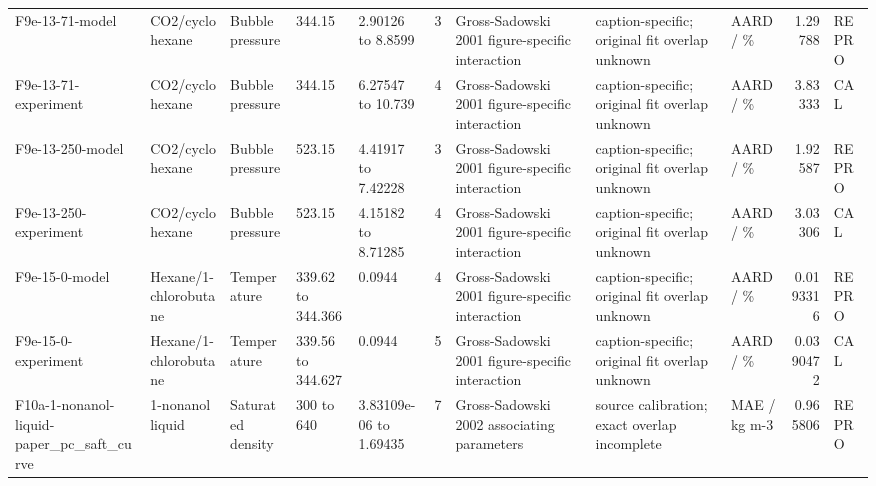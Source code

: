 \begin{landscape}
\begin{longtable}{L{1.9cm}L{2.5cm}L{2.1cm}L{1.6cm}L{1.6cm}rL{2.4cm}L{1.9cm}L{2.2cm}rL{1cm}}
F9e-\allowbreak{}13-\allowbreak{}71-\allowbreak{}model & CO2/\allowbreak{}cyclohexane & Bubble pressure & 344.15 & 2.90126 to 8.8599 & 3 & Gross-\allowbreak{}Sadowski 2001 figure-\allowbreak{}specific interaction & caption-\allowbreak{}specific; original fit overlap unknown & AARD /\allowbreak{} \% & 1.29788 & REPRO \\
F9e-\allowbreak{}13-\allowbreak{}71-\allowbreak{}experiment & CO2/\allowbreak{}cyclohexane & Bubble pressure & 344.15 & 6.27547 to 10.739 & 4 & Gross-\allowbreak{}Sadowski 2001 figure-\allowbreak{}specific interaction & caption-\allowbreak{}specific; original fit overlap unknown & AARD /\allowbreak{} \% & 3.83333 & CAL \\
F9e-\allowbreak{}13-\allowbreak{}250-\allowbreak{}model & CO2/\allowbreak{}cyclohexane & Bubble pressure & 523.15 & 4.41917 to 7.42228 & 3 & Gross-\allowbreak{}Sadowski 2001 figure-\allowbreak{}specific interaction & caption-\allowbreak{}specific; original fit overlap unknown & AARD /\allowbreak{} \% & 1.92587 & REPRO \\
F9e-\allowbreak{}13-\allowbreak{}250-\allowbreak{}experiment & CO2/\allowbreak{}cyclohexane & Bubble pressure & 523.15 & 4.15182 to 8.71285 & 4 & Gross-\allowbreak{}Sadowski 2001 figure-\allowbreak{}specific interaction & caption-\allowbreak{}specific; original fit overlap unknown & AARD /\allowbreak{} \% & 3.03306 & CAL \\
F9e-\allowbreak{}15-\allowbreak{}0-\allowbreak{}model & Hexane/\allowbreak{}1-\allowbreak{}chlorobutane & Temperature & 339.62 to 344.366 & 0.0944 & 4 & Gross-\allowbreak{}Sadowski 2001 figure-\allowbreak{}specific interaction & caption-\allowbreak{}specific; original fit overlap unknown & AARD /\allowbreak{} \% & 0.0193316 & REPRO \\
F9e-\allowbreak{}15-\allowbreak{}0-\allowbreak{}experiment & Hexane/\allowbreak{}1-\allowbreak{}chlorobutane & Temperature & 339.56 to 344.627 & 0.0944 & 5 & Gross-\allowbreak{}Sadowski 2001 figure-\allowbreak{}specific interaction & caption-\allowbreak{}specific; original fit overlap unknown & AARD /\allowbreak{} \% & 0.0390472 & CAL \\
F10a-\allowbreak{}1-\allowbreak{}nonanol-\allowbreak{}liquid-\allowbreak{}paper\_\allowbreak{}pc\_\allowbreak{}saft\_\allowbreak{}curve & 1-\allowbreak{}nonanol liquid & Saturated density & 300 to 640 & 3.83109e-\allowbreak{}06 to 1.69435 & 7 & Gross-\allowbreak{}Sadowski 2002 associating parameters & source calibration; exact overlap incomplete & MAE /\allowbreak{} kg m-\allowbreak{}3 & 0.965806 & REPRO \\

\end{longtable}
\end{landscape}
